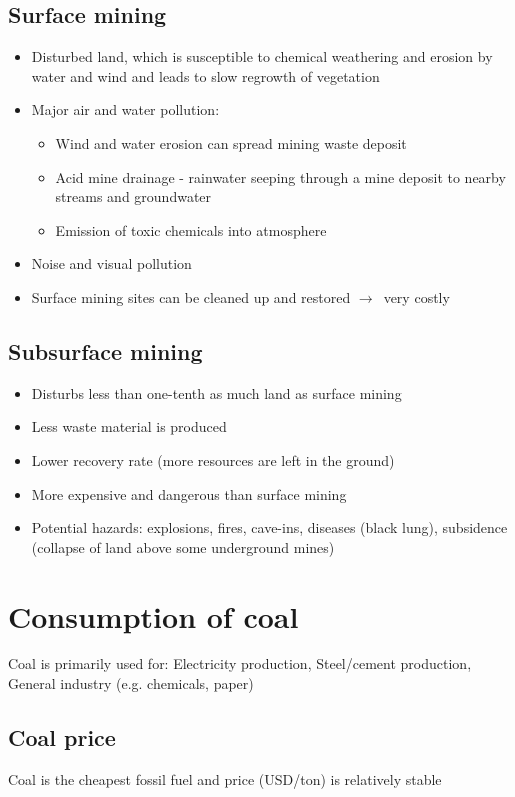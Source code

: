 \documentclass{article}
\begin{document}
\subsection{Surface mining}
\begin{itemize}
    \item Disturbed land, which is susceptible to chemical weathering and erosion by water and wind and leads to slow regrowth of vegetation
    \item Major air and water pollution:
    \begin{itemize}
        \item Wind and water erosion can spread mining waste deposit
        \item Acid mine drainage - rainwater seeping through a mine deposit to nearby streams and groundwater
        \item Emission of toxic chemicals into atmosphere
    \end{itemize}
    \item Noise and visual pollution
    \item Surface mining sites can be cleaned up and restored $\to$\ very costly
\end{itemize}

\subsection{Subsurface mining}
\begin{itemize}
    \item Disturbs less than one-tenth as much land as surface mining
    \item Less waste material is produced
    \item Lower recovery rate (more resources are left in the ground)
    \item More expensive and dangerous than surface mining
    \item Potential hazards: explosions, fires, cave-ins, diseases (black lung), subsidence (collapse of land above some underground mines)
\end{itemize}

\section{Consumption of coal}
Coal is primarily used for: Electricity production, Steel/cement production, General industry (e.g. chemicals, paper)

\subsection{Coal price}
Coal is the cheapest fossil fuel and price (USD/ton) is relatively stable
\end{document}
